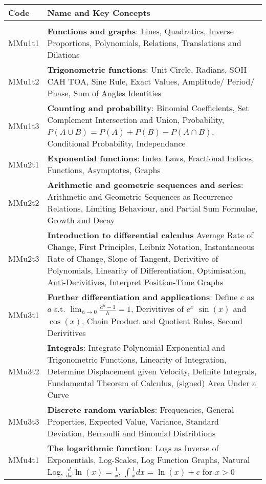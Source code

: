 \documentclass[varwidth=144mm, 12pt]{standalone}
\begin{document}
\begin{longtable}{lp{}}
Code & \textbf{Name} and Key Concepts \\ \hline
& \\ \endhead
MMu1t1 & \textbf{Functions and graphs}: Lines, Quadratics, Inverse Proportions, Polynomials, Relations, Translations and Dilations \\
MMu1t2 & \textbf{Trigonometric functions}: Unit Circle, Radians, SOH CAH TOA, Sine Rule, Exact Values, Amplitude/ Period/ Phase, Sum of Angles Identities \\
MMu1t3 & \textbf{Counting and probability}: Binomial Coefficients, Set Complement Intersection and Union, Probability, $P(A\cup{}B) = P(A) + P(B) - P(A\cap{}B)$, Conditional Probability, Independance \\
MMu2t1 & \textbf{Exponential functions}: Index Laws, Fractional Indices, Functions, Asymptotes, Graphs \\
MMu2t2 & \textbf{Arithmetic and geometric sequences and series}: Arithmetic and Geometric Sequences as Recurrence Relations, Limiting Behaviour, and Partial Sum Formulae, Growth and Decay \\
MMu2t3 & \textbf{Introduction to differential calculus} Average Rate of Change, First Principles, Leibniz Notation, Instantaneous Rate of Change, Slope of Tangent, Derivitive of Polynomials, Linearity of Differentiation, Optimisation, Anti-Derivitives, Interpret Position-Time Graphs \\
MMu3t1 & \textbf{Further differentiation and applications}: Define $e$ as $a$ s.t. $\lim_{h \to 0} \frac{a^h - 1}{h} = 1$, Derivitives of $e^x$ $\sin(x)$ and $\cos(x)$, Chain Product and Quotient Rules, Second Derivitives \\
MMu3t2 & \textbf{Integrals}: Integrate Polynomial Exponential and Trigonometric Functions, Linearity of Integration,  Determine Displacement given Velocity, Definite Integrals, Fundamental Theorem of Calculus, (signed) Area Under a Curve \\
MMu3t3 & \textbf{Discrete random variables}: Frequencies, General Properties, Expected Value, Variance, Standard Deviation, Bernoulli and Binomial Distribtions \\
MMu4t1 & \textbf{The logarithmic function}: Logs as Inverse of Exponentials, Log-Scales, Log Function Graphs, Natural Log, $\frac{d}{dx}\ln(x) = \frac{1}{x}$, $\int{\frac{1}{x}dx} = \ln(x) + c$ for $x > 0$ \\

\end{longtable}
\end{document}

